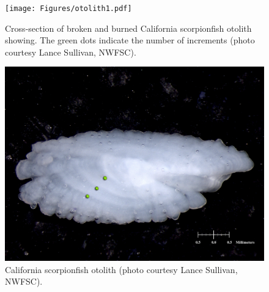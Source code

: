 \documentclass[12pt,]{article}
\begin{document}
\FloatBarrier

\begin{figure}[htbp]
\centering
\texttt{[image: Figures/otolith1.pdf]}
\caption{Cross-section of broken and burned California scorpionfish
otolith showing. The green dots indicate the number of increments (photo
courtesy Lance Sullivan, NWFSC). \label{fig:otolith1}}
\end{figure}

\begin{figure}[htbp]
\centering
\includegraphics{Figures/otolith2.pdf}
\caption{California scorpionfish otolith (photo courtesy Lance Sullivan,
NWFSC). \label{fig:otolith2}}
\end{figure}
\end{document}

